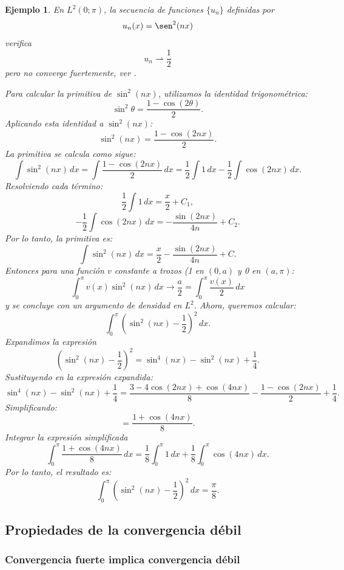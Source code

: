 \documentclass[12pt]{book}
\newtheorem{ex}{Ejemplo}
\theoremstyle{definition}
\theoremstyle{plain}
\theoremstyle{remark}
\begin{document}
\begin{ex}
En $L^2(0;\pi)$, la secuencia de funciones $\{u_n\}$ definidas por
\[
u_n(x)=\sen^2(n x)
\]
verifica
\[u_n \rightharpoonup \frac12\]
pero no converge fuertemente, ver 
\cite{bressan2014}. 
%

\medskip

Para calcular la primitiva de \(\sin^2(nx)\), utilizamos la identidad trigonométrica:
\[
\sin^2 \theta = \frac{1 - \cos(2\theta)}{2}.
\]
Aplicando esta identidad a \(\sin^2(nx)\):
\[
\sin^2(nx) = \frac{1 - \cos(2nx)}{2}.
\]
La primitiva se calcula como sigue:
\[
\int \sin^2(nx) \, dx = \int \frac{1 - \cos(2nx)}{2} \, dx = \frac{1}{2} \int 1 \, dx - \frac{1}{2} \int \cos(2nx) \, dx.
\]
Resolviendo cada término:
\[
\frac{1}{2} \int 1 \, dx = \frac{x}{2} + C_1,
\]
\[
-\frac{1}{2} \int \cos(2nx) \, dx = -\frac{\sin(2nx)}{4n} + C_2.
\]
Por lo tanto, la primitiva es:
\[
\boxed{\int \sin^2(nx) \, dx = \frac{x}{2} - \frac{\sin(2nx)}{4n} + C.}
\]
Entonces para una función $v$ constante a trozos (1 en $(0,a)$ y 0 en $(a,\pi)$:
\[
\int_0^\pi v(x) \sin^2(nx) \, dx 
\rightarrow 
\frac{a}{2} =
\int_0^\pi \frac{v(x)}{2} \, dx
\]
y se concluye con un argumento de densidad en $L^2$.
%
Ahora,
queremos calcular:
\[
\int_0^\pi \left(\sin^2(nx) - \frac{1}{2}\right)^2 \, dx.
\]
{Expandimos la expresión}
\[
\left(\sin^2(nx) - \frac{1}{2}\right)^2 = \sin^4(nx) - \sin^2(nx) + \frac{1}{4}.
\]
Sustituyendo en la expresión expandida:
\[
\sin^4(nx) - \sin^2(nx) + \frac{1}{4} = \frac{3 - 4\cos(2nx) + \cos(4nx)}{8} - \frac{1 - \cos(2nx)}{2} + \frac{1}{4}.
\]
Simplificando:
\[
= \frac{1 + \cos(4nx)}{8}.
\]
{Integrar la expresión simplificada}
\[
\int_0^\pi \frac{1 + \cos(4nx)}{8} \, dx = \frac{1}{8} \int_0^\pi 1 \, dx + \frac{1}{8} \int_0^\pi \cos(4nx) \, dx.
\]
Por lo tanto, el resultado es:
\[
\boxed{\int_0^\pi \left(\sin^2(nx) - \frac{1}{2}\right)^2 \, dx = \frac{\pi}{8}.}
\]
\end{ex}

\subsection{Propiedades de la convergencia débil}

\subsubsection{Convergencia fuerte implica convergencia débil}
\end{document}
